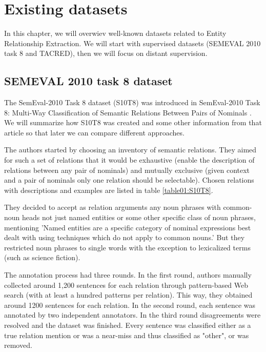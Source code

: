 \chapter{Existing datasets}

In this chapter, we will overwiev well-known datasets related to Entity Relationship Extraction. We will start with supervised datasets (SEMEVAL 2010 task 8 and TACRED), then we will focus on distant supervision.



\section{SEMEVAL 2010 task 8 dataset}
The SemEval-2010 Task 8 dataset (S10T8) was introduced in SemEval-2010 Task 8: Multi-Way Classification of Semantic Relations Between Pairs of Nominals \cite{semeval}. We will summarize how S10T8 was created and some other information from that article so that later we can compare different approaches.


The authors started by choosing an inventory of semantic relations. They aimed for such a set of relations that it would be exhaustive (enable the description of relations between any pair of nominals) and mutually exclusive (given context and a pair of nominals only one relation should be selectable).  Chosen relations with descriptions and examples are listed in table \ref{table01:S10T8}. 

They decided to accept as relation arguments any noun phrases with common-noun heads not just named entities or some other specific class of noun phrases, mentioning  'Named entities are a specific category of nominal expressions best dealt with using techniques which do not apply to common nouns.'  But they restricted noun phrases to single words with the exception to lexicalized terms (such as  science fiction).

The annotation process had three rounds. In the first round, authors manually collected around 1,200 sentences for each relation through pattern-based Web search (with at least a hundred patterns per relation). This way, they obtained around 1200 sentences for each relation. In the second round, each sentence was annotated by two independent annotators. In the third round disagreements were resolved and the dataset was finished. Every sentence was classified either as a true relation mention or was a  near-miss and thus classified as "other", or was removed.

